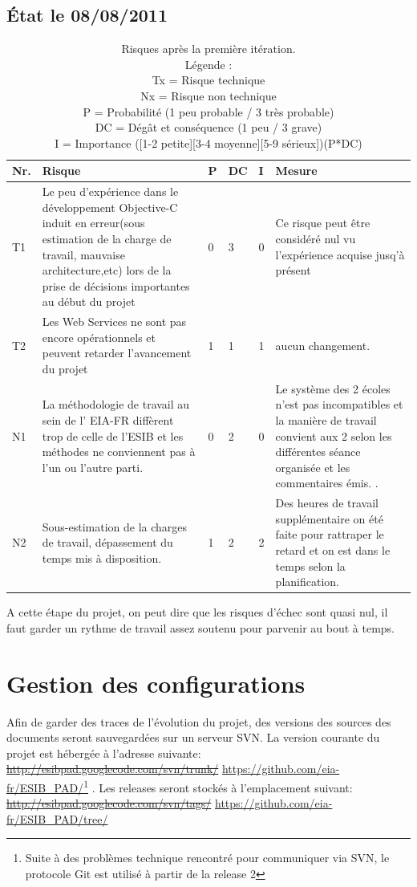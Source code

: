 	\subsection{État le 08/08/2011  }
	\begin{table}[H]
	\begin{tabular}{|l|p{6cm}|l|l|l|p{6cm}|}
		\hline  Nr. & Risque & P  & DC & I & Mesure \\ 
		\hline  {\color{green}T1} & Le peu d'expérience dans le développement \gls{Objective-C} induit en erreur(sous estimation de la charge de travail, mauvaise architecture,etc) lors de la prise de décisions importantes au début du projet &0 & 3 & 0 & Ce risque peut être considéré nul vu l'expérience acquise jusq'à présent   \\ 
		\hline  {\color{green}T2} & Les Web Services ne sont pas encore opérationnels et peuvent retarder l'avancement du projet & 1 & 1 & 1 & aucun changement.  \\ 
		\hline  \color{green}N1 & La méthodologie de travail au sein de l' \gls{EIA-FR} diffèrent trop de celle de l'\gls{ESIB}  et les méthodes ne conviennent pas à l'un ou l'autre parti.  & 0 & 2 & 0 & Le système des 2 écoles n'est pas incompatibles et la manière de travail convient aux 2 selon les différentes séance organisée et les commentaires émis. .  \\ 
		\hline  {\color{green}N2} & Sous-estimation de la charges de travail, dépassement du temps mis à disposition.  & 1 & 2 & 2 & Des heures de travail supplémentaire on été faite pour rattraper le retard et on est dans le temps selon la planification.  \\ 
		\hline 
	\end{tabular} 
	\caption{ Risques après la première itération.\\ Légende :\\
Tx = Risque technique\\
Nx = Risque non technique\\
P = Probabilité  (1 peu probable / 3 très probable)\\ 
DC = Dégât et conséquence (1 peu / 3 grave)\\
I =  Importance ([1-2 petite][3-4 moyenne][5-9 sérieux])(P*DC)
}
	\end{table}
A cette étape du projet, on peut dire que les risques d'échec sont quasi nul, il faut garder un rythme de travail assez soutenu pour parvenir au bout à temps.  

\section{Gestion des configurations}
Afin de garder des traces de l'évolution du projet, des versions des sources des documents seront sauvegardées sur un serveur \gls{SVN}. La version courante du projet est hébergée à l'adresse suivante:  \sout{\url{http://esibpad.googlecode.com/svn/trunk/}} \url{https://github.com/eia-fr/ESIB_PAD/}\footnote{Suite à des problèmes technique rencontré pour communiquer via SVN, le protocole \gls{Git} est utilisé à partir de la release 2} . Les releases seront stockés  à l'emplacement suivant: \sout{\url{http://esibpad.googlecode.com/svn/tags/}} \url{ https://github.com/eia-fr/ESIB_PAD/tree/} 

